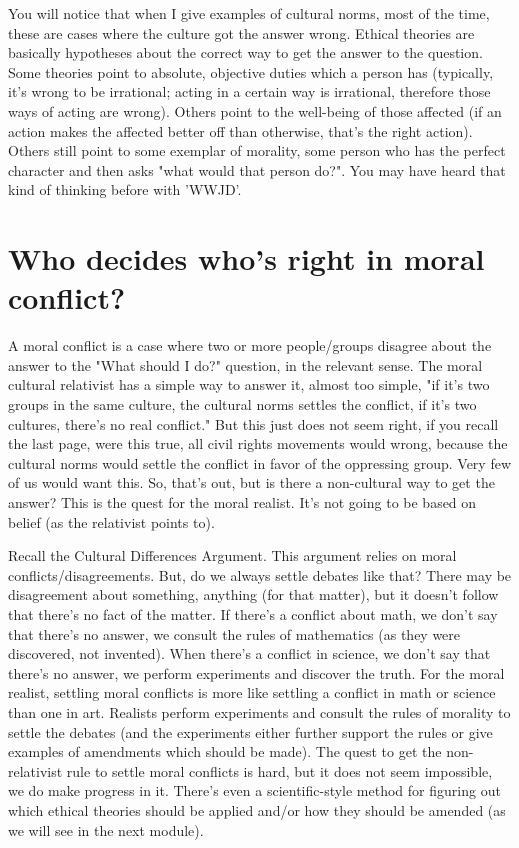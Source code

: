 You will notice that when I give examples of cultural norms, most of the time, these are cases where the culture got the answer wrong. Ethical theories are basically hypotheses about the correct way to get the answer to the question. Some theories point to absolute, objective duties which a person has (typically, it's wrong to be irrational; acting in a certain way is irrational, therefore those ways of acting are wrong). Others point to the well-being of those affected (if an action makes the affected better off than otherwise, that's the right action). Others still point to some exemplar of morality, some person who has the perfect character and then asks "what would that person do?". You may have heard that kind of thinking before with 'WWJD'.  
\section{Who decides who's right in moral conflict?}

A moral conflict is a case where two or more people/groups disagree about the answer to the "What should I do?" question, in the relevant sense. The moral cultural relativist has a simple way to answer it, almost too simple, "if it's two groups in the same culture, the cultural norms settles the conflict, if it's two cultures, there's no real conflict." But this just does not seem right, if you recall the last page, were this true, all civil rights movements would wrong, because the cultural norms would settle the conflict in favor of the oppressing group. Very few of us would want this. So, that's out, but is there a non-cultural way to get the answer? This is the quest for the moral realist. It's not going to be based on belief (as the relativist points to).

Recall the Cultural Differences Argument. This argument relies on moral conflicts/disagreements. But, do we always settle debates like that? There may be disagreement about something, anything (for that matter), but it doesn't follow that there's no fact of the matter. If there's a conflict about math, we don't say that there's no answer, we consult the rules of mathematics (as they were discovered, not invented). When there's a conflict in science, we don't say that there's no answer, we perform experiments and discover the truth. For the moral realist, settling moral conflicts is more like settling a conflict in math or science than one in art. Realists perform experiments and consult the rules of morality to settle the debates (and the experiments either further support the rules or give examples of amendments which should be made). The quest to get the non-relativist rule to settle moral conflicts is hard, but it does not seem impossible, we do make progress in it. There's even a scientific-style method for figuring out which ethical theories should be applied and/or how they should be amended (as we will see in the next module).

